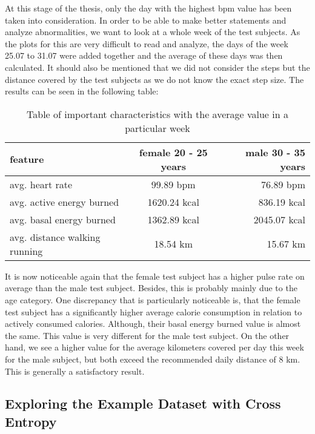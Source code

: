 At this stage of the thesis, only the day with the highest bpm value has been taken into consideration. In order to be able to make better statements and analyze abnormalities, we want to look at a whole week of the test subjects. As the plots for this are very difficult to read and analyze, the days of the week 25.07 to 31.07 were added together and the average of these days was then calculated. 
It should also be mentioned that we did not consider the steps but the distance covered by the test subjects as we do not know the exact step size. 
The results can be seen in the following table: 

\FloatBarrier
\begin{table}[h!]
\centering
\begin{tabular}{|l|c|r|}
\hline
\textbf{feature} & \textbf{female 20 - 25 years } & \textbf{male  30 - 35 years} \\ \hline
avg. heart rate      & 99.89 bpm         &  76.89 bpm       \\ \hline
avg. active energy burned      & 1620.24 kcal         & 836.19 kcal       \\ \hline
avg. basal energy burned & 1362.89 kcal         & 2045.07 kcal      \\ \hline
avg. distance walking running      & 18.54 km         & 15.67 km     \\ \hline
\end{tabular}
\caption{Table of important characteristics with the average value in a particular week}
\label{table:example}
\end{table}
\FloatBarrier

It is now noticeable again that the female test subject has a higher pulse rate on average than the male test subject. Besides, this is probably mainly due to the age category. One discrepancy that is particularly noticeable is, that the female test subject has a significantly higher average calorie consumption in relation to actively consumed calories. Although, their basal energy burned value is almost the same. This value is very different for the male test subject. On the other hand, we see a higher value for the average kilometers covered per day this week for the male subject, but both exceed the recommended daily distance of 8 km. This is generally a satisfactory result.

\subsection{Exploring the Example Dataset with Cross Entropy}

